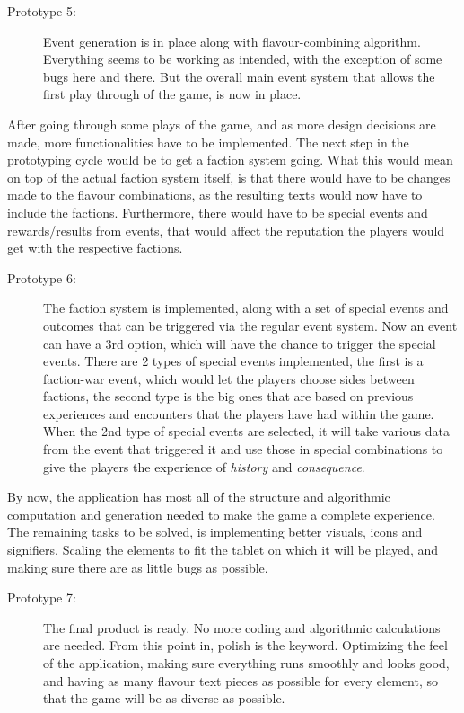 \begin{description}
\item[Prototype 5:] Event generation is in place along with flavour-combining algorithm. Everything seems to be working as intended, with the exception of some bugs here and there. But the overall main event system that allows the first play through of the game, is now in place.
\end{description}

After going through some plays of the game, and as more design decisions are made, more functionalities have to be implemented. The next step in the prototyping cycle would be to get a faction system going. What this would mean on top of the actual faction system itself, is that there would have to be changes made to the flavour combinations, as the resulting texts would now have to include the factions. Furthermore, there would have to be special events and rewards/results from events, that would affect the reputation the players would get with the respective factions.

\begin{description}
\item[Prototype 6:]
The faction system is implemented, along with a set of special events and outcomes that can be triggered via the regular event system. Now an event can have a 3rd option, which will have the chance to trigger the special events. There are 2 types of special events implemented, the first is a faction-war event, which would let the players choose sides between factions, the second type is the big ones that are based on previous experiences and encounters that the players have had within the game. When the 2nd type of special events are selected, it will take various data from the event that triggered it and use those in special combinations to give the players the experience of \textit{history} and \textit{consequence}.
\end{description}

By now, the application has most all of the structure and algorithmic computation and generation needed to make the game a complete experience.
The remaining tasks to be solved, is implementing better visuals, icons and signifiers. Scaling the elements to fit the tablet on which it will be played, and making sure there are as little bugs as possible.

\begin{description}
\item[Prototype 7:]
The final product is ready. No more coding and algorithmic calculations are needed. From this point in, polish is the keyword. Optimizing the feel of the application, making sure everything runs smoothly and looks good, and having as many flavour text pieces as possible for every element, so that the game will be as diverse as possible.
\end{description}

